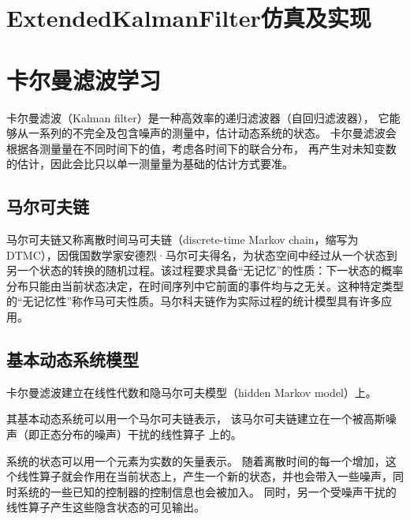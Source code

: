 \documentclass{article}
\begin{document}
\section{ExtendedKalmanFilter仿真及实现}
\section{卡尔曼滤波学习}
卡尔曼滤波（Kalman filter）是一种高效率的递归滤波器（自回归滤波器），
它能够从一系列的不完全及包含噪声的测量中，估计动态系统的状态。
 卡尔曼滤波会根据各测量量在不同时间下的值，考虑各时间下的联合分布，
 再产生对未知变数的估计，因此会比只以单一测量量为基础的估计方式要准。

 \subsection{马尔可夫链}
 马尔可夫链又称离散时间马可夫链（discrete-time Markov chain，缩写为DTMC），因俄国数学家安德烈·马尔可夫得名，为状态空间中经过从一个状态到另一个状态的转换的随机过程。该过程要求具备“无记忆”的性质：下一状态的概率分布只能由当前状态决定，在时间序列中它前面的事件均与之无关。这种特定类型的“无记忆性”称作马可夫性质。马尔科夫链作为实际过程的统计模型具有许多应用。
 \subsection{基本动态系统模型}
 卡尔曼滤波建立在线性代数和隐马尔可夫模型（hidden Markov model）上。
 
 其基本动态系统可以用一个马尔可夫链表示，
 该马尔可夫链建立在一个被高斯噪声（即正态分布的噪声）干扰的线性算子
 上的。
 
 系统的状态可以用一个元素为实数的矢量表示。 随着离散时间的每一个增加，这个线性算子就会作用在当前状态上，产生一个新的状态，并也会带入一些噪声，同时系统的一些已知的控制器的控制信息也会被加入。 同时，另一个受噪声干扰的线性算子产生这些隐含状态的可见输出。
\end{document}

